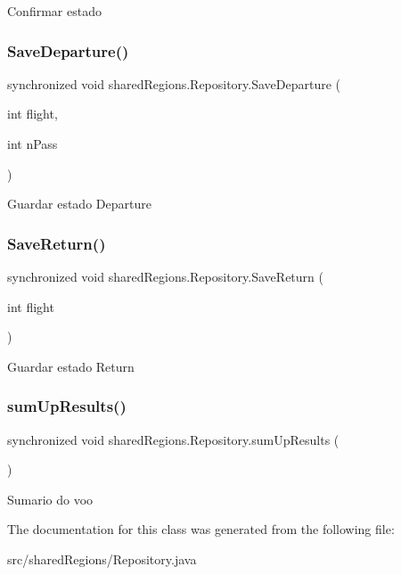 Confirmar estado \mbox{\label{classshared_regions_1_1_repository_a62d61843e1213324bf579c3db5c2fe96}} 
\subsubsection{\texorpdfstring{Save\+Departure()}{SaveDeparture()}}
{\footnotesize\ttfamily synchronized void shared\+Regions.\+Repository.\+Save\+Departure (\begin{DoxyParamCaption}\item[{int}]{flight,  }\item[{int}]{n\+Pass }\end{DoxyParamCaption})\hspace{0.3cm}{\ttfamily [inline]}}

Guardar estado Departure \mbox{\label{classshared_regions_1_1_repository_ace95e612ae18dffa8d67e34fa264153d}} 
\subsubsection{\texorpdfstring{Save\+Return()}{SaveReturn()}}
{\footnotesize\ttfamily synchronized void shared\+Regions.\+Repository.\+Save\+Return (\begin{DoxyParamCaption}\item[{int}]{flight }\end{DoxyParamCaption})\hspace{0.3cm}{\ttfamily [inline]}}

Guardar estado Return \mbox{\label{classshared_regions_1_1_repository_ad1f23250d858b294d3d443367c88a855}} 
\subsubsection{\texorpdfstring{sum\+Up\+Results()}{sumUpResults()}}
{\footnotesize\ttfamily synchronized void shared\+Regions.\+Repository.\+sum\+Up\+Results (\begin{DoxyParamCaption}{ }\end{DoxyParamCaption})\hspace{0.3cm}{\ttfamily [inline]}}

Sumario do voo 

The documentation for this class was generated from the following file\+:\begin{DoxyCompactItemize}
\item 
src/shared\+Regions/Repository.\+java\end{DoxyCompactItemize}

